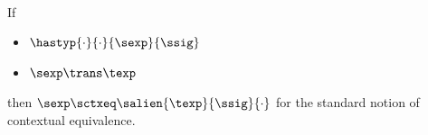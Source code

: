 \begin{corollary}\ \\
  If
  \begin{itemize}
  \item $\hastyp{\cdot}{\cdot}{\sexp}{\ssig}$
  \item $\sexp \trans \texp$
  \end{itemize}
  then
  $\sexp \sctxeq \salien{\texp}{\ssig}{\cdot} $ for the standard notion of contextual equivalence.
\end{corollary}
